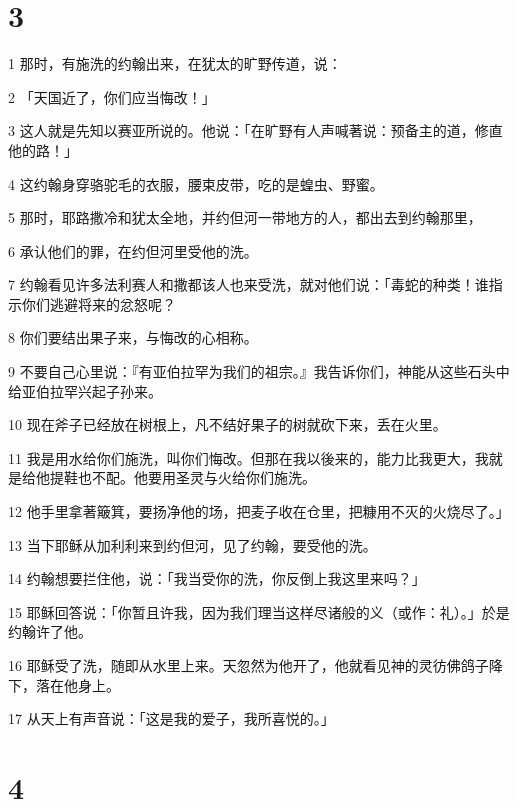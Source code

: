 \chapter{3}

\par 1 那时，有施洗的约翰出来，在犹太的旷野传道，说：
\par 2 「天国近了，你们应当悔改！」
\par 3 这人就是先知以赛亚所说的。他说：「在旷野有人声喊著说：预备主的道，修直他的路！」
\par 4 这约翰身穿骆驼毛的衣服，腰束皮带，吃的是蝗虫、野蜜。
\par 5 那时，耶路撒冷和犹太全地，并约但河一带地方的人，都出去到约翰那里，
\par 6 承认他们的罪，在约但河里受他的洗。
\par 7 约翰看见许多法利赛人和撒都该人也来受洗，就对他们说：「毒蛇的种类！谁指示你们逃避将来的忿怒呢？
\par 8 你们要结出果子来，与悔改的心相称。
\par 9 不要自己心里说：『有亚伯拉罕为我们的祖宗。』我告诉你们，神能从这些石头中给亚伯拉罕兴起子孙来。
\par 10 现在斧子已经放在树根上，凡不结好果子的树就砍下来，丢在火里。
\par 11 我是用水给你们施洗，叫你们悔改。但那在我以後来的，能力比我更大，我就是给他提鞋也不配。他要用圣灵与火给你们施洗。
\par 12 他手里拿著簸箕，要扬净他的场，把麦子收在仓里，把糠用不灭的火烧尽了。」
\par 13 当下耶稣从加利利来到约但河，见了约翰，要受他的洗。
\par 14 约翰想要拦住他，说：「我当受你的洗，你反倒上我这里来吗？」
\par 15 耶稣回答说：「你暂且许我，因为我们理当这样尽诸般的义（或作：礼）。」於是约翰许了他。
\par 16 耶稣受了洗，随即从水里上来。天忽然为他开了，他就看见神的灵彷佛鸽子降下，落在他身上。
\par 17 从天上有声音说：「这是我的爱子，我所喜悦的。」

\chapter{4}

